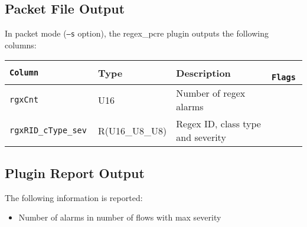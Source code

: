 \documentclass[documentation]{subfiles}
\begin{document}
\subsection{Packet File Output}
In packet mode ({\tt --s} option), the regex\_pcre plugin outputs the following columns:
\begin{longtable}{>{\tt}lll>{\tt\small}l}
    \toprule
    {\bf Column} & {\bf Type} & {\bf Description} & {\bf Flags}\\
    \midrule\endhead%
    rgxCnt                  & U16                  & Number of regex alarms                        & \\
    rgxRID\_cType\_sev      & R(U16\_U8\_U8)       & Regex ID, class type and severity             & \\
    \bottomrule
\end{longtable}

\subsection{Plugin Report Output}
The following information is reported:
\begin{itemize}
    \item Number of alarms in number of flows with max severity
\end{itemize}
\end{document}
